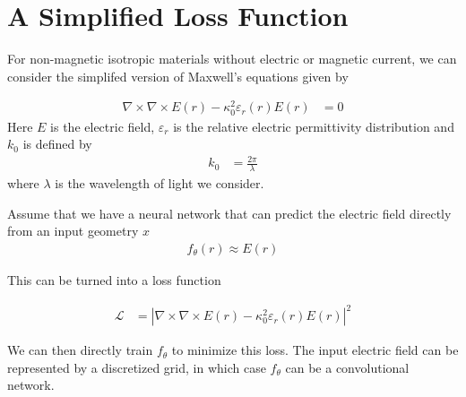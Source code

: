 \documentclass[book.tex]{subfiles}
\begin{document}
\section{A Simplified Loss Function}

For non-magnetic isotropic materials without electric or magnetic current, we can consider the simplifed version of Maxwell's equations given by

\begin{align}
\nabla \times \nabla \times E(r) - \kappa_0^2 \varepsilon_r(r) E(r) &= 0
\end{align}
Here $E$ is the electric field, $\varepsilon_r$ is the relative electric permittivity distribution and $k_0$ is defined by
\begin{align}
k_0 &= \frac{2 \pi}{\lambda}
\end{align}
where $\lambda$ is the wavelength of light we consider.

Assume that we have a neural network that can predict the electric field directly from an input geometry $x$
\begin{align}
f_\theta(r) \approx E(r)
\end{align}

This can be turned into a loss function

\begin{align}
\mathcal{L} &= | \nabla \times \nabla \times E(r) - \kappa_0^2 \varepsilon_r(r) E(r)|^2
\end{align}

We can then directly train $f_\theta$ to minimize this loss. The input electric field can be represented by a discretized grid, in which case $f_\theta$ can be a convolutional network.

\end{document}
